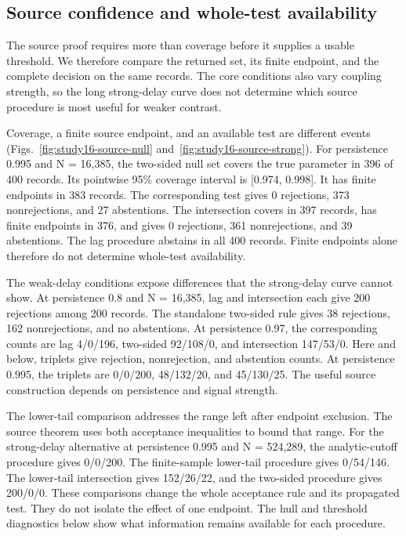 \subsection{Source confidence and whole-test availability}

The source proof requires more than coverage before it supplies a usable threshold. We therefore compare the returned set, its finite endpoint, and the complete decision on the same records. The core conditions also vary coupling strength, so the long strong-delay curve does not determine which source procedure is most useful for weaker contrast.

Coverage, a finite source endpoint, and an available test are different events (Figs.~\ref{fig:study16-source-null} and~\ref{fig:study16-source-strong}). For persistence 0.995 and N = 16,385, the two-sided null set covers the true parameter in 396 of 400 records. Its pointwise 95\% coverage interval is [0.974, 0.998]. It has finite endpoints in 383 records. The corresponding test gives 0 rejections, 373 nonrejections, and 27 abstentions. The intersection covers in 397 records, has finite endpoints in 376, and gives 0 rejections, 361 nonrejections, and 39 abstentions. The lag procedure abstains in all 400 records. Finite endpoints alone therefore do not determine whole-test availability.

The weak-delay conditions expose differences that the strong-delay curve cannot show. At persistence 0.8 and N = 16,385, lag and intersection each give 200 rejections among 200 records. The standalone two-sided rule gives 38 rejections, 162 nonrejections, and no abstentions. At persistence 0.97, the corresponding counts are lag 4/0/196, two-sided 92/108/0, and intersection 147/53/0. Here and below, triplets give rejection, nonrejection, and abstention counts. At persistence 0.995, the triplets are 0/0/200, 48/132/20, and 45/130/25. The useful source construction depends on persistence and signal strength.

The lower-tail comparison addresses the range left after endpoint exclusion. The source theorem uses both acceptance inequalities to bound that range. For the strong-delay alternative at persistence 0.995 and N = 524,289, the analytic-cutoff procedure gives 0/0/200. The finite-sample lower-tail procedure gives 0/54/146. The lower-tail intersection gives 152/26/22, and the two-sided procedure gives 200/0/0. These comparisons change the whole acceptance rule and its propagated test. They do not isolate the effect of one endpoint. The hull and threshold diagnostics below show what information remains available for each procedure.

